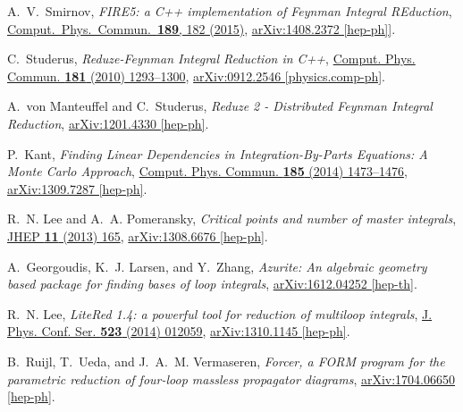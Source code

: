 \documentclass[a4paper,12pt]{scrartcl}
\begin{document}
\begin{thebibliography}{10}
  A.~V.~Smirnov,
  {\em {FIRE5: a C++ implementation of Feynman Integral REduction}},
  \href{http://dx.doi.org/10.1016/j.cpc.2014.11.024}{Comput.\ Phys.\ Commun.\  \textbf{189}, 182 (2015)},
  \href{http://arxiv.org/abs/1408.2372}{{\ttfamily arXiv:1408.2372 [hep-ph]]}}.

C.~Studerus, {\em {Reduze-Feynman Integral Reduction in C++}},
  \href{http://dx.doi.org/10.1016/j.cpc.2010.03.012}{Comput. Phys. Commun.
  {\bfseries 181} (2010) 1293--1300},
\href{http://arxiv.org/abs/0912.2546}{{\ttfamily arXiv:0912.2546
  [physics.comp-ph]}}.

A.~von Manteuffel and C.~Studerus, {\em {Reduze 2 - Distributed Feynman
  Integral Reduction}},
\href{http://arxiv.org/abs/1201.4330}{{\ttfamily arXiv:1201.4330 [hep-ph]}}.

P.~Kant, {\em {Finding Linear Dependencies in Integration-By-Parts Equations: A
  Monte Carlo Approach}},
  \href{http://dx.doi.org/10.1016/j.cpc.2014.01.017}{Comput. Phys. Commun.
  {\bfseries 185} (2014) 1473--1476},
\href{http://arxiv.org/abs/1309.7287}{{\ttfamily arXiv:1309.7287 [hep-ph]}}.

R.~N. Lee and A.~A. Pomeransky, {\em {Critical points and number of master
  integrals}}, \href{http://dx.doi.org/10.1007/JHEP11(2013)165}{JHEP {\bfseries
  11} (2013) 165},
\href{http://arxiv.org/abs/1308.6676}{{\ttfamily arXiv:1308.6676 [hep-ph]}}.

A.~Georgoudis, K.~J. Larsen, and Y.~Zhang, {\em {Azurite: An algebraic geometry
  based package for finding bases of loop integrals}},
\href{http://arxiv.org/abs/1612.04252}{{\ttfamily arXiv:1612.04252 [hep-th]}}.

R.~N. Lee, {\em {LiteRed 1.4: a powerful tool for reduction of multiloop
  integrals}}, \href{http://dx.doi.org/10.1088/1742-6596/523/1/012059}{J. Phys.
  Conf. Ser. {\bfseries 523} (2014) 012059},
\href{http://arxiv.org/abs/1310.1145}{{\ttfamily arXiv:1310.1145 [hep-ph]}}.

B.~Ruijl, T.~Ueda, and J.~A.~M. Vermaseren, {\em {Forcer, a FORM program for
  the parametric reduction of four-loop massless propagator diagrams}},
\href{http://arxiv.org/abs/1704.06650}{{\ttfamily arXiv:1704.06650 [hep-ph]}}.


\end{thebibliography}
\end{document}
